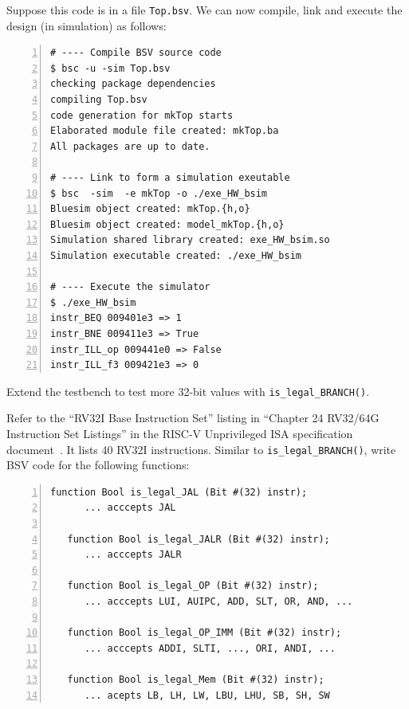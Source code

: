 Suppose this code is in a file \verb|Top.bsv|.  We can now compile,
link and execute the design (in simulation) as follows:

{\small
\begin{Verbatim}[frame=single, numbers=left]
# ---- Compile BSV source code
$ bsc -u -sim Top.bsv
checking package dependencies
compiling Top.bsv
code generation for mkTop starts
Elaborated module file created: mkTop.ba
All packages are up to date.

# ---- Link to form a simulation exeutable
$ bsc  -sim  -e mkTop -o ./exe_HW_bsim
Bluesim object created: mkTop.{h,o}
Bluesim object created: model_mkTop.{h,o}
Simulation shared library created: exe_HW_bsim.so
Simulation executable created: ./exe_HW_bsim

# ---- Execute the simulator
$ ./exe_HW_bsim
instr_BEQ 009401e3 => 1
instr_BNE 009411e3 => True
instr_ILL_op 009441e0 => False
instr_ILL_f3 009421e3 => 0
\end{Verbatim}
}


\hdivider

\Exercise

Extend the testbench to test more 32-bit values with
\verb|is_legal_BRANCH()|.

\Exercise

Refer to the ``RV32I Base Instruction Set'' listing in ``Chapter 24
RV32/64G Instruction Set Listings'' in the RISC-V Unprivileged ISA
specification document~\cite{RISCV_Unpriv_2019_12_13}.  It lists 40
RV32I instructions.  Similar to \verb|is_legal_BRANCH()|, write BSV
code for the following functions:

{\small
\begin{Verbatim}[frame=single, numbers=left]
   function Bool is_legal_JAL (Bit #(32) instr);
      ... acccepts JAL

   function Bool is_legal_JALR (Bit #(32) instr);
      ... acccepts JALR

   function Bool is_legal_OP (Bit #(32) instr);
      ... acccepts LUI, AUIPC, ADD, SLT, OR, AND, ...

   function Bool is_legal_OP_IMM (Bit #(32) instr);
      ... acccepts ADDI, SLTI, ..., ORI, ANDI, ...

   function Bool is_legal_Mem (Bit #(32) instr);
      ... acepts LB, LH, LW, LBU, LHU, SB, SH, SW
\end{Verbatim}
}

